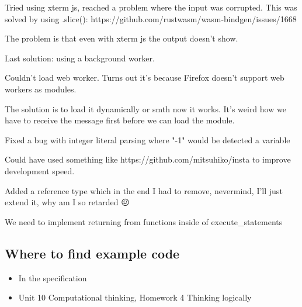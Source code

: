 \documentclass{article}
\begin{document}
Tried using xterm js, reached a problem where the input was corrupted. This was
solved by using .slice(): https://github.com/rustwasm/wasm-bindgen/issues/1668

The problem is that even with xterm js the output doesn't show.

Last solution: using a background worker.

Couldn't load web worker. Turns out it's because Firefox doesn't support web
workers as modules.

The solution is to load it dynamically or smth now it works. It's weird how we
have to receive the message first before we can load the module.

Fixed a bug with integer literal parsing where "-1" would be detected a
variable

Could have used something like https://github.com/mitsuhiko/insta to improve
development speed.

Added a reference type which in the end I had to remove, nevermind, I'll just
extend it, why am I so retarded 😖

We need to implement returning from functions inside of execute\_statements

\subsection{Where to find example code}

\begin{itemize}
	\item In the specification
	\item Unit 10 Computational thinking, Homework 4 Thinking logically
\end{itemize}

\printbibliography[heading=bibintoc]
\end{document}
